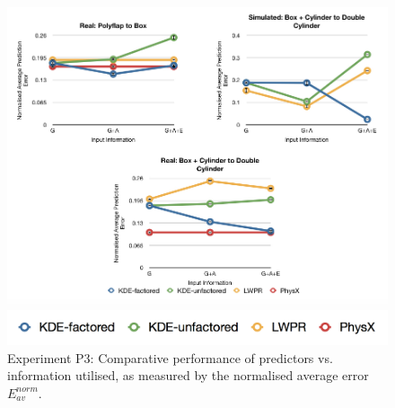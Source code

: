 \begin{figure}[t]
\centerline{\includegraphics[width=0.95\columnwidth]{graphs_jw/S_real_sim_av_graph}
}
\centerline{\includegraphics[width=0.9\columnwidth]{graphs_jw/graph_key}}
\caption{Experiment P3: Comparative performance of predictors vs. information utilised, as measured by the normalised average error ${E_{av}^{norm}}$. 
}\label{fig:S_av_graphs}
\end{figure}


